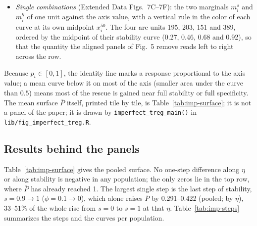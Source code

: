 \documentclass[11pt]{article}
\begin{document}
\begin{itemize}
  (a $10 \times 11$ array placed at the step midpoints) and
  $\Delta_\eta \bar P(s, \eta + 0.05) = \bar P(s, \eta + 0.1) - \bar P(s, \eta)$
  for $\eta = 0, \dots, 0.9$ (an $11 \times 10$ array), where
  $\bar P(s, \eta) = |\mathcal C|^{-1}\sum_{i\in\mathcal C} p_i(1 - s, \eta)$ is
  the mean surface. Both panels share one white-to-black scale from 0 to the
  largest difference in either.
\item \emph{Single combinations} (Extended Data Figs.~7C--7F): the two marginals $m^s_i$ and
  $m^\eta_i$ of one unit against the axis value, with a vertical rule in the
  color of each curve at its own midpoint $x^{50}_i$. The four are units 195,
  203, 151 and 389, ordered by the midpoint of their stability curve (0.27,
  0.46, 0.68 and 0.92), so that the quantity the aligned panels of Fig.~5
  remove reads left to right across the row.
\end{itemize}
Because $p_i \in [0,1]$, the identity line marks a response proportional to the
axis value; a mean curve below it on most of the axis (smaller area under the
curve than $0.5$) means most of the rescue is gained near full stability or full specificity. The
mean surface $\bar P$ itself, printed tile by tile, is
Table~\ref{tab:imp-surface}; it is not a panel of the paper; it is drawn by
\texttt{imperfect\_treg\_main()} in \texttt{lib/fig\_imperfect\_treg.R}.

\subsection{Results behind the panels}

Table~\ref{tab:imp-surface} gives the pooled surface. No one-step
difference along $\eta$ or along stability is negative in any population; the
only zeros lie in the top row, where $\bar P$ has already reached 1. The largest single step is the last step of stability,
$s = 0.9 \to 1$ ($\phi = 0.1 \to 0$), which alone raises $\bar P$ by 0.291--0.422
(pooled; by $\eta$), 33--51\% of the whole rise from $s = 0$ to $s = 1$ at that
$\eta$. Table~\ref{tab:imp-steps} summarizes the steps and the curves per
population.
\end{document}

